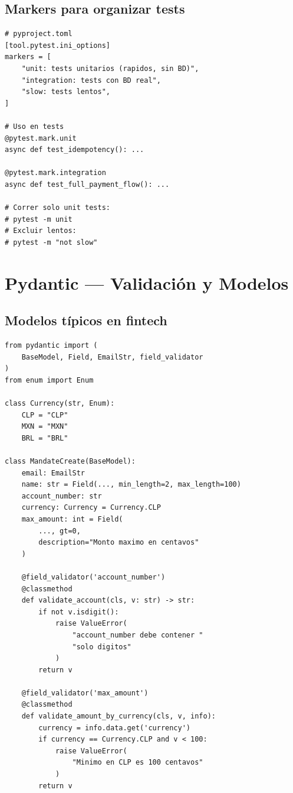 \documentclass[11pt,a4paper]{article}
\begin{document}
\subsection{Markers para organizar tests}

\begin{pybox}
\begin{lstlisting}[style=python]
# pyproject.toml
[tool.pytest.ini_options]
markers = [
    "unit: tests unitarios (rapidos, sin BD)",
    "integration: tests con BD real",
    "slow: tests lentos",
]

# Uso en tests
@pytest.mark.unit
async def test_idempotency(): ...

@pytest.mark.integration
async def test_full_payment_flow(): ...

# Correr solo unit tests:
# pytest -m unit
# Excluir lentos:
# pytest -m "not slow"
\end{lstlisting}
\end{pybox}

\section{Pydantic — Validación y Modelos}

\subsection{Modelos típicos en fintech}

\begin{pybox}
\begin{lstlisting}[style=python]
from pydantic import (
    BaseModel, Field, EmailStr, field_validator
)
from enum import Enum

class Currency(str, Enum):
    CLP = "CLP"
    MXN = "MXN"
    BRL = "BRL"

class MandateCreate(BaseModel):
    email: EmailStr
    name: str = Field(..., min_length=2, max_length=100)
    account_number: str
    currency: Currency = Currency.CLP
    max_amount: int = Field(
        ..., gt=0,
        description="Monto maximo en centavos"
    )

    @field_validator('account_number')
    @classmethod
    def validate_account(cls, v: str) -> str:
        if not v.isdigit():
            raise ValueError(
                "account_number debe contener "
                "solo digitos"
            )
        return v

    @field_validator('max_amount')
    @classmethod
    def validate_amount_by_currency(cls, v, info):
        currency = info.data.get('currency')
        if currency == Currency.CLP and v < 100:
            raise ValueError(
                "Minimo en CLP es 100 centavos"
            )
        return v
\end{lstlisting}
\end{pybox}
\end{document}
